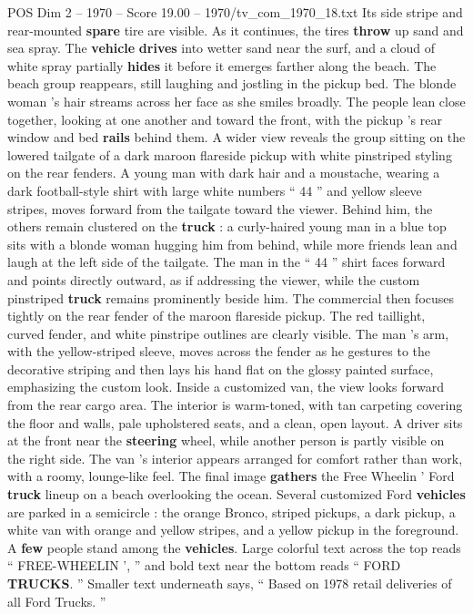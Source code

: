 \begin{textsample}{POS Dim 2 – 1970 – Score 19.00 – 1970/tv\_com\_1970\_18.txt}
Its side stripe and rear-mounted \textbf{spare} tire are visible.
As it continues, the tires \textbf{throw} up sand and sea spray.
The \textbf{vehicle} \textbf{drives} into wetter sand near the surf, and a cloud of white spray partially \textbf{hides} it before it emerges farther along the beach.
The beach group reappears, still laughing and jostling in the pickup bed.
The blonde woman ’s hair streams across her face as she smiles broadly.
The people lean close together, looking at one another and toward the front, with the pickup ’s rear window and bed \textbf{rails} behind them.
A wider view reveals the group sitting on the lowered tailgate of a dark maroon flareside pickup with white pinstriped styling on the rear fenders.
A young man with dark hair and a moustache, wearing a dark football-style shirt with large white numbers “ 44 ” and yellow sleeve stripes, moves forward from the tailgate toward the viewer.
Behind him, the others remain clustered on the \textbf{truck} : a curly-haired young man in a blue top sits with a blonde woman hugging him from behind, while more friends lean and laugh at the left side of the tailgate.
The man in the “ 44 ” shirt faces forward and points directly outward, as if addressing the viewer, while the custom pinstriped \textbf{truck} remains prominently beside him.
The commercial then focuses tightly on the rear fender of the maroon flareside pickup.
The red taillight, curved fender, and white pinstripe outlines are clearly visible.
The man ’s arm, with the yellow-striped sleeve, moves across the fender as he gestures to the decorative striping and then lays his hand flat on the glossy painted surface, emphasizing the custom look.
Inside a customized van, the view looks forward from the rear cargo area.
The interior is warm-toned, with tan carpeting covering the floor and walls, pale upholstered seats, and a clean, open layout.
A driver sits at the front near the \textbf{steering} wheel, while another person is partly visible on the right side.
The van ’s interior appears arranged for comfort rather than work, with a roomy, lounge-like feel.
The final image \textbf{gathers} the Free Wheelin ’ Ford \textbf{truck} lineup on a beach overlooking the ocean.
Several customized Ford \textbf{vehicles} are parked in a semicircle : the orange Bronco, striped pickups, a dark pickup, a white van with orange and yellow stripes, and a yellow pickup in the foreground.
A \textbf{few} people stand among the \textbf{vehicles}.
Large colorful text across the top reads “ FREE-WHEELIN ’, ” and bold text near the bottom reads “ FORD \textbf{TRUCKS}. ” Smaller text underneath says, “ Based on 1978 retail deliveries of all Ford Trucks. ”

\end{textsample}

